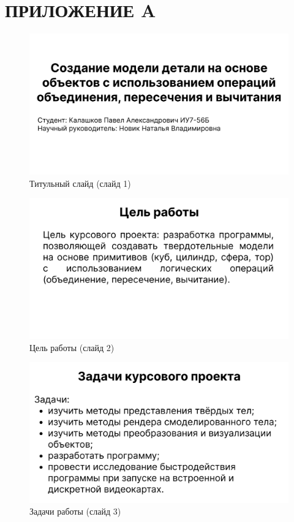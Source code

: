 \section*{ПРИЛОЖЕНИЕ A}

\begin{figure}[h]
	\centering
	\captionsetup{justification=centering}
	\includegraphics[width=150mm]{img/slide1.png}
	\caption{Титульный слайд (слайд 1)}
	\label{fig:slide-1}
\end{figure}

\begin{figure}[h]
	\centering
	\captionsetup{justification=centering}
	\includegraphics[width=150mm]{img/slide2.png}
	\caption{Цель работы (слайд 2)}
	\label{fig:slide-2}
\end{figure}

\begin{figure}[h]
	\centering
	\captionsetup{justification=centering}
	\includegraphics[width=150mm]{img/slide3.png}
	\caption{Задачи работы (слайд 3)}
	\label{fig:slide-3}
\end{figure}

